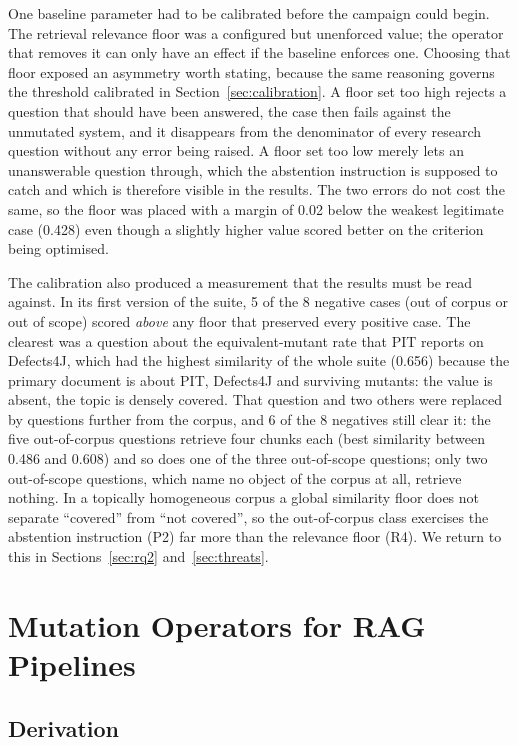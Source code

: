 \documentclass[a4paper,fleqn]{cas-dc}
\begin{document}
One baseline parameter had to be calibrated before the campaign could begin.
The retrieval relevance floor was a configured but unenforced value; the
operator that removes it can only have an effect if the baseline enforces one.
Choosing that floor exposed an asymmetry worth stating, because the same
reasoning governs the threshold calibrated in Section~\ref{sec:calibration}. A
floor set too high rejects a question that should have been answered, the case
then fails against the unmutated system, and it disappears from the denominator
of every research question without any error being raised. A floor set too low
merely lets an unanswerable question through, which the abstention instruction
is supposed to catch and which is therefore visible in the results. The two
errors do not cost the same, so the floor was placed with a margin of 0.02
below the weakest legitimate case (0.428) even though a slightly higher value
scored better on the criterion being optimised.

The calibration also produced a measurement that the results must be read
against. In its first version of the suite, 5 of the 8 negative cases (out of
corpus or out of scope) scored \emph{above} any floor that preserved every
positive case. The clearest was a question about the equivalent-mutant rate
that PIT reports on Defects4J, which had the highest similarity of the whole
suite (0.656) because the primary document is about PIT, Defects4J and
surviving mutants: the value is absent, the topic is densely covered. That
question and two others were replaced by questions further from the corpus,
and 6 of the 8 negatives still clear it: the five out-of-corpus questions
retrieve four chunks each (best similarity between 0.486 and 0.608) and so
does one of the three out-of-scope questions; only two out-of-scope questions,
which name no object of the corpus at all, retrieve nothing. In a topically
homogeneous corpus a global similarity floor does not separate ``covered'' from
``not covered'', so the out-of-corpus class exercises the abstention
instruction (P2) far more than the relevance floor (R4). We return to this in
Sections~\ref{sec:rq2} and~\ref{sec:threats}.

\section{Mutation Operators for RAG Pipelines}
\label{sec:operators}

\subsection{Derivation}
\label{sec:derivation}
\end{document}
